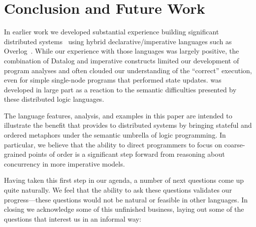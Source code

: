 \section{Conclusion and Future Work}
In earlier work we developed substantial experience building significant
distributed systems~\cite{boom-eurosys,netdb,Chu:2007,p2} using hybrid
declarative/imperative languages such as Overlog~\cite{Loo2009-CACM}.  While our
experience with those languages was largely positive, the combination of Datalog
and imperative constructs limited our development of program analyses and often
clouded our understanding of the ``correct'' execution, even for simple
single-node programs that performed state updates.  \lang was developed in large
part as a reaction to the semantic difficulties presented by these distributed
logic languages.

The language features, analysis, and examples in this paper are intended to illustrate the benefit that \lang provides to distributed systems by bringing stateful and ordered metaphors under the semantic umbrella of logic programming.  In particular, we believe that the ability to direct programmers to focus on coarse-grained points of order is a significant step forward from reasoning about concurrency in more imperative models.

Having taken this first step in our agenda, a number of next questions come up quite naturally.  We feel that the ability to ask these questions validates our progress---these questions would not be natural or feasible in other languages.  In closing we acknowledge some of this unfinished business, laying out some of the questions that interest us in an informal way:

